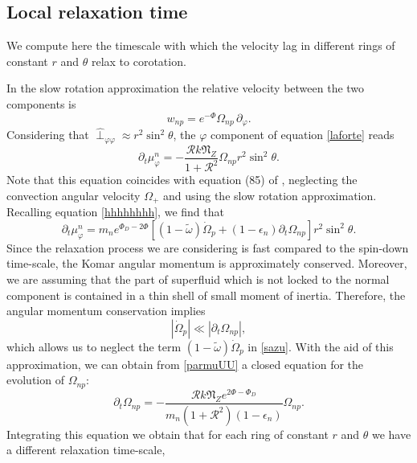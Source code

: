 \documentclass[usenatbib%
]{mnras}
\begin{document}
\subsection{Local relaxation time}

We compute here the timescale with which the velocity lag in different rings  of constant $r$ and $\theta$ relax to corotation.

In the slow rotation approximation the relative velocity between the two components is
\begin{equation}
w_{np}= e^{-\Phi}\Omega_{np} \, \partial_\varphi.
\end{equation} 
Considering that $\hat{\perp}_{\varphi \varphi} \approx r^2 \sin^2 \theta$, the $\varphi$ component of equation \eqref{laforte} reads
\begin{equation}\label{parmuUU}
\partial_t \mu_{\varphi}^n = -\dfrac{\mathcal{R}k\mathfrak{N}_Z }{1+\mathcal{R}^2} \Omega_{np} r^2 \sin^2 \theta.
\end{equation}
Note that this equation coincides with equation (85) of \cite{langlois98}, neglecting the convection angular velocity $\Omega_+$ and using the slow rotation approximation. 
Recalling equation \eqref{hhhhhhhh}, we find that
\begin{equation}\label{sazu}
\partial_t \mu_{\varphi}^n =m_n e^{\Phi_D -2\Phi} [(1-\tilde{\omega})\dot{\Omega}_p +(1-\epsilon_n) \partial_t \Omega_{np}] r^2 \sin^2 \theta.
\end{equation}
Since the relaxation process we are considering is fast compared to the spin-down time-scale, the Komar angular momentum is approximately conserved. Moreover,  we are assuming that the part of superfluid which is not locked to the normal component is contained in a thin shell of small moment of inertia. Therefore, the angular momentum conservation implies
\begin{equation}
|\dot{\Omega}_p| \ll |\partial_t \Omega_{np}|,
\end{equation}
which allows us to neglect the term $(1-\tilde{\omega})\dot{\Omega}_p$ in  \eqref{sazu}. 
With the aid of this approximation, we can obtain from \eqref{parmuUU} a closed equation for the evolution of $\Omega_{np}$:
\begin{equation}
\partial_t \Omega_{np} = - \dfrac{\mathcal{R}k\mathfrak{N}_Z e^{2\Phi -\Phi_D}}{m_n(1+\mathcal{R}^2)(1-\epsilon_n)} \Omega_{np}.
\end{equation}
Integrating this equation we obtain that for each ring of constant $r$ and $\theta$ we have a different relaxation time-scale,
\end{document}
